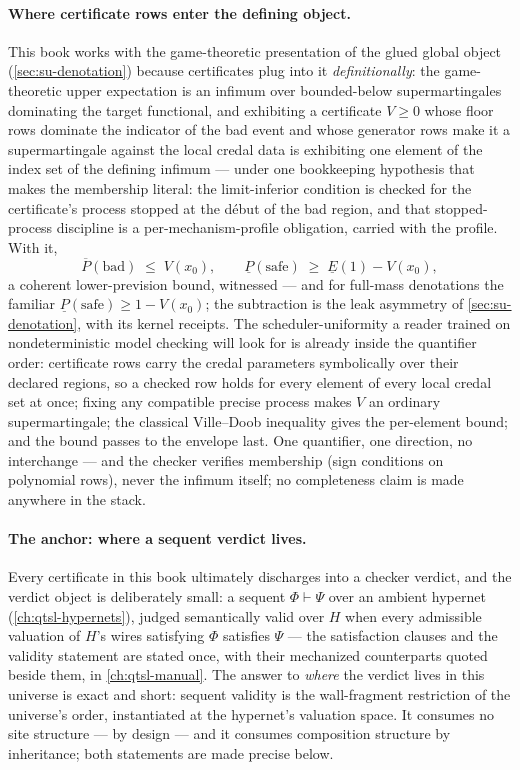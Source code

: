 \paragraph{Where certificate rows enter the defining object.} This
book works with the game-theoretic presentation of the glued
global object (\autoref{sec:su-denotation}) because
certificates plug into it \emph{definitionally}: the game-theoretic
upper expectation is an infimum over bounded-below supermartingales
dominating the target functional, and exhibiting a certificate
$V \ge 0$ whose floor rows dominate the indicator of the bad event
and whose generator rows make it a supermartingale against the local
credal data is exhibiting one element of the index set of the
defining infimum --- under one bookkeeping hypothesis that makes
the membership literal: the limit-inferior condition is checked for
the certificate's process stopped at the d\'ebut of the bad region,
and that stopped-process discipline is a per-mechanism-profile
obligation, carried with the profile. With it,
\[
  \overline{P}(\mathrm{bad}) \;\le\; V(x_0), \qquad
  \underline{P}(\mathrm{safe}) \;\ge\; \underline{E}(1) - V(x_0),
\]
a coherent lower-prevision bound, witnessed --- and for full-mass
denotations the familiar
$\underline{P}(\mathrm{safe}) \ge 1 - V(x_0)$; the subtraction is
the leak asymmetry of \autoref{sec:su-denotation}, with its
kernel receipts. The
scheduler-uniformity a reader trained on nondeterministic model
checking will look for is already inside the quantifier order:
certificate rows carry the credal parameters symbolically over
their declared regions, so a checked row holds for every element of
every local credal set at once; fixing any compatible precise
process makes $V$ an ordinary supermartingale; the classical
Ville--Doob inequality gives the per-element bound; and the bound
passes to the envelope last. One quantifier, one direction, no
interchange --- and the checker verifies membership (sign
conditions on polynomial rows), never the infimum itself; no
completeness claim is made anywhere in the stack.

\paragraph{The anchor: where a sequent verdict lives.} Every
certificate in this book ultimately discharges into a checker
verdict, and the verdict object is deliberately small: a sequent
$\Phi \vdash \Psi$ over an ambient hypernet
(\autoref{ch:qtsl-hypernets}), judged semantically valid over
$H$ when every admissible valuation of $H$'s wires satisfying
$\Phi$ satisfies $\Psi$ --- the satisfaction clauses and the
validity statement are stated once, with their mechanized
counterparts quoted beside them, in \autoref{ch:qtsl-manual}.
The answer to \emph{where} the verdict lives in this universe is
exact and short: sequent validity is the wall-fragment restriction
of the universe's order, instantiated at the hypernet's valuation
space. It consumes no site structure --- by design --- and it
consumes composition structure by inheritance; both statements are
made precise below.

